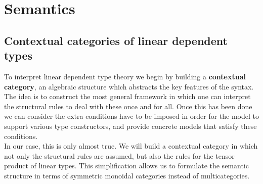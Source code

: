 \section{Semantics}
\subsection{Contextual categories of linear dependent types}
To interpret linear dependent type theory we begin by building a \textbf{contextual category}, an algebraic structure which abstracts the key features of the syntax. The idea is to construct the most general framework in which one can interpret the structural rules to deal with these once and for all. Once this has been done we can consider the extra conditions have to be imposed in order for the model to support various type constructors, and provide concrete models that satisfy these conditions.\\

In our case, this is only almost true. We will build a contextual category in which not only the structural rules are assumed, but also the rules for the tensor product of linear types. This simplification allows us to formulate the semantic structure in terms of symmetric monoidal categories instead of multicategories.

